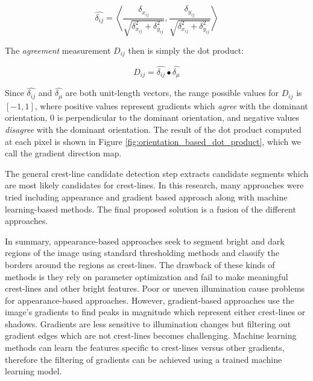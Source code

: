 \begin{equation}
\hat{\delta_{ij}} = \left\langle \frac{\delta_{x_{ij}}}{\sqrt{\delta_{x_{ij}}^2 + \delta_{y_{ij}}^2}}, \frac{\delta_{y_{ij}}}{\sqrt{\delta_{x_{ij}}^2 + \delta_{y_{ij}}^2}}\right\rangle 
\end{equation}

The \emph{agreement} measurement $D_{ij}$ then is simply the dot product:

\begin{equation}
D_{ij} = \hat{\delta_{ij}} \bullet \hat{\delta_{\mu}}
\end{equation}

Since $\hat{\delta_{ij}}$ and $\hat{\delta_{\mu}}$ are both unit-length vectors, the range possible values for $D_{ij}$ is $[-1, 1]$, where positive values represent gradients which \emph{agree} with the dominant orientation, 0 is perpendicular to the dominant orientation, and negative values \emph{disagree} with the dominant orientation. The result of the dot product computed at each pixel is shown in Figure \ref{fig:orientation_based_dot_product}, which we call the gradient direction map.


The general crest-line candidate detection step extracts candidate segments which are most likely candidates for crest-lines. In this research, many approaches were tried including appearance and gradient based approach along with machine learning-based methods. The final proposed solution is a fusion of the different approaches.

In summary, appearance-based approaches seek to segment bright and dark regions of the image using standard thresholding methods and classify the borders around the regions as crest-lines. The drawback of these kinds of methods is they rely on parameter optimization and fail to make meaningful crest-lines and other bright features. Poor or uneven illumination cause problems for appearance-based approaches. However, gradient-based approaches use the image's gradients to find peaks in magnitude which represent either crest-lines or shadows. Gradients are less sensitive to illumination changes but filtering out gradient edges which are not crest-lines becomes challenging. Machine learning methods can learn the features specific to crest-lines versus other gradients, therefore the filtering of gradients can be achieved using a trained machine learning model.

